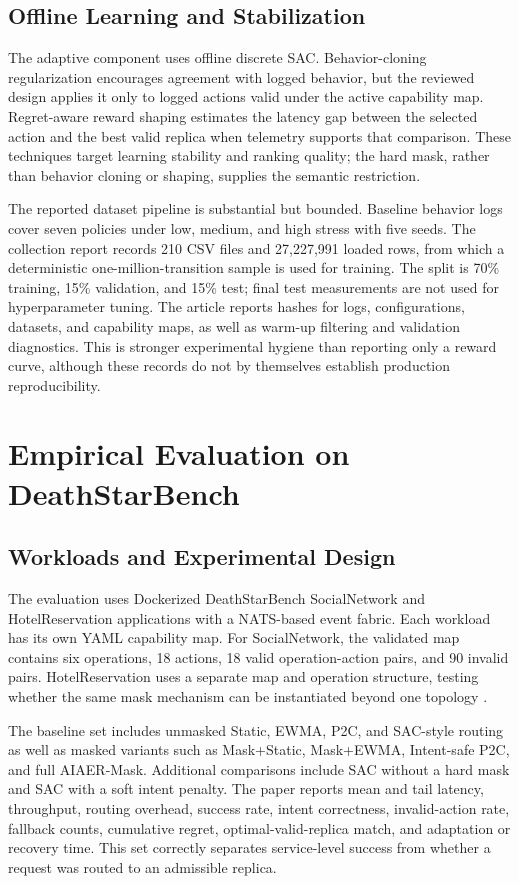 \documentclass[conference]{IEEEtran}
\begin{document}
\subsection{Offline Learning and Stabilization}
The adaptive component uses offline discrete SAC. Behavior-cloning regularization encourages agreement with logged behavior, but the reviewed design applies it only to logged actions valid under the active capability map. Regret-aware reward shaping estimates the latency gap between the selected action and the best valid replica when telemetry supports that comparison. These techniques target learning stability and ranking quality; the hard mask, rather than behavior cloning or shaping, supplies the semantic restriction.

The reported dataset pipeline is substantial but bounded. Baseline behavior logs cover seven policies under low, medium, and high stress with five seeds. The collection report records 210 CSV files and 27,227,991 loaded rows, from which a deterministic one-million-transition sample is used for training. The split is 70\% training, 15\% validation, and 15\% test; final test measurements are not used for hyperparameter tuning. The article reports hashes for logs, configurations, datasets, and capability maps, as well as warm-up filtering and validation diagnostics. This is stronger experimental hygiene than reporting only a reward curve, although these records do not by themselves establish production reproducibility.

\section{Empirical Evaluation on DeathStarBench}
\subsection{Workloads and Experimental Design}
The evaluation uses Dockerized DeathStarBench SocialNetwork and HotelReservation applications with a NATS-based event fabric. Each workload has its own YAML capability map. For SocialNetwork, the validated map contains six operations, 18 actions, 18 valid operation-action pairs, and 90 invalid pairs. HotelReservation uses a separate map and operation structure, testing whether the same mask mechanism can be instantiated beyond one topology \cite{gan2019,hassan2026}.

The baseline set includes unmasked Static, EWMA, P2C, and SAC-style routing as well as masked variants such as Mask+Static, Mask+EWMA, Intent-safe P2C, and full AIAER-Mask. Additional comparisons include SAC without a hard mask and SAC with a soft intent penalty. The paper reports mean and tail latency, throughput, routing overhead, success rate, intent correctness, invalid-action rate, fallback counts, cumulative regret, optimal-valid-replica match, and adaptation or recovery time. This set correctly separates service-level success from whether a request was routed to an admissible replica.
\end{document}
